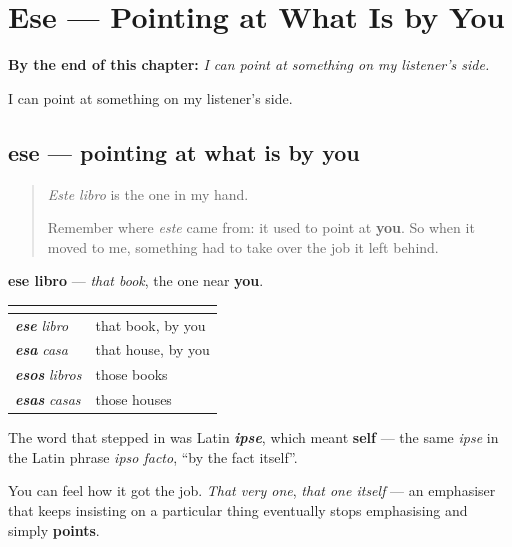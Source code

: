 
\chapter{Ese --- Pointing at What Is by You}
\label{ch:ese}

\begin{chapteropening}
\textbf{By the end of this chapter:} \emph{I can point at something on my listener's side.}

I can point at something on my listener's side.
\end{chapteropening}

\section[ese]{ese — pointing at what is by you}

\label{lesson:ES-C59-ese}



\begin{quote}
\emph{Este libro} is the one in my hand.

Remember where \emph{este} came from: it used to point at \textbf{you}. So when it moved to me, something had to take over the job it left behind.
\end{quote}

\begin{cousinweb}
\textbf{ese libro} — \emph{that book}, the one near \textbf{you}.

\noindent
\begin{tabularx}{\linewidth}{@{}>{\raggedright\arraybackslash}X>{\raggedright\arraybackslash}X@{}}
\toprule
\textbf{} & \textbf{} \\
\midrule
\emph{\textbf{ese}} \emph{libro} & that book, by you \\
\emph{\textbf{esa}} \emph{casa} & that house, by you \\
\emph{\textbf{esos}} \emph{libros} & those books \\
\emph{\textbf{esas}} \emph{casas} & those houses \\
\bottomrule
\end{tabularx}

The word that stepped in was Latin \emph{\textbf{ipse}}, which meant \textbf{self} — the same \emph{ipse} in the Latin phrase \emph{ipso facto}, \textquotedblleft{}by the fact itself\textquotedblright{}.

You can feel how it got the job. \emph{That very one}, \emph{that one itself} — an emphasiser that keeps insisting on a particular thing eventually stops emphasising and simply \textbf{points}.
\end{cousinweb}

